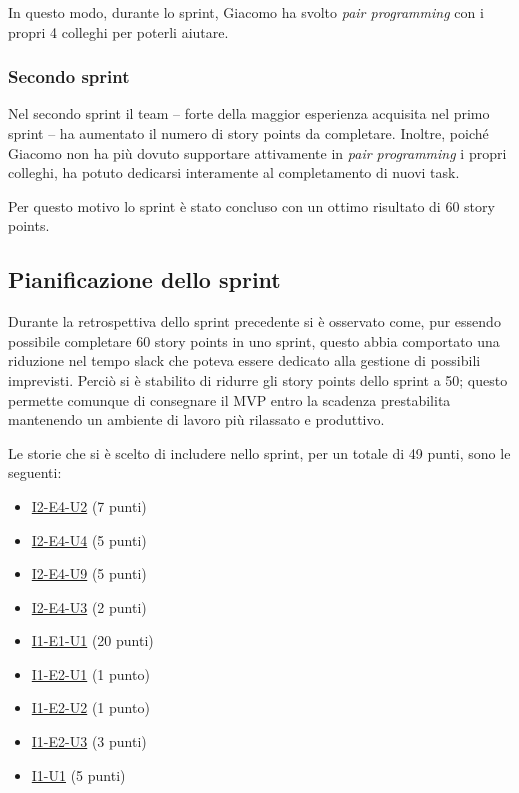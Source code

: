 In questo modo, durante lo sprint, Giacomo ha svolto \emph{pair programming} con i propri 4 colleghi per poterli aiutare.

\subsubsection{Secondo sprint}
Nel secondo sprint il team -- forte della maggior esperienza acquisita nel primo sprint -- ha aumentato il numero di story points da completare.
Inoltre, poiché Giacomo non ha più dovuto supportare attivamente in \emph{pair programming} i propri colleghi, ha potuto dedicarsi interamente al completamento di nuovi task.

Per questo motivo lo sprint è stato concluso con un ottimo risultato di 60 story points.

\subsection{Pianificazione dello sprint}
Durante la retrospettiva dello sprint precedente si è osservato come, pur essendo possibile completare 60 story points in uno sprint, questo abbia comportato una riduzione nel tempo slack che poteva essere dedicato alla gestione di possibili imprevisti. Perciò si è stabilito di ridurre gli story points dello sprint a 50; questo permette comunque di consegnare il MVP entro la scadenza prestabilita mantenendo un ambiente di lavoro più rilassato e produttivo.

Le storie che si è scelto di includere nello sprint, per un totale di 49 punti, sono le seguenti:
\begin{itemize}
  \item \href{user-story:i2-e4-u2}{I2-E4-U2} (7 punti)
  \item \href{user-story:i2-e4-u4}{I2-E4-U4} (5 punti)
  \item \href{user-story:i2-e4-u9}{I2-E4-U9} (5 punti)
  \item \href{user-story:i2-e4-u3}{I2-E4-U3} (2 punti)
  \item \href{user-story:i1-e1-u1}{I1-E1-U1} (20 punti)
  \item \href{user-story:i1-e2-u1}{I1-E2-U1} (1 punto)
  \item \href{user-story:i1-e2-u2}{I1-E2-U2} (1 punto)
  \item \href{user-story:i1-e2-u3}{I1-E2-U3} (3 punti)
  \item \href{user-story:i1-u1}{I1-U1} (5 punti)
\end{itemize}

